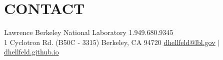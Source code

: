 \vspace{-15pt}
\section{\small{CONTACT}}

Lawrence Berkeley National Laboratory \hfill 1.949.680.9345\\
1 Cyclotron Rd. (B50C - 3315) Berkeley, CA 94720 \hfill \href{mailto:dhellfeld@lbl.gov}{dhellfeld@lbl.gov} $|$ \href{https://dhellfeld.github.io}{dhellfeld.github.io}

